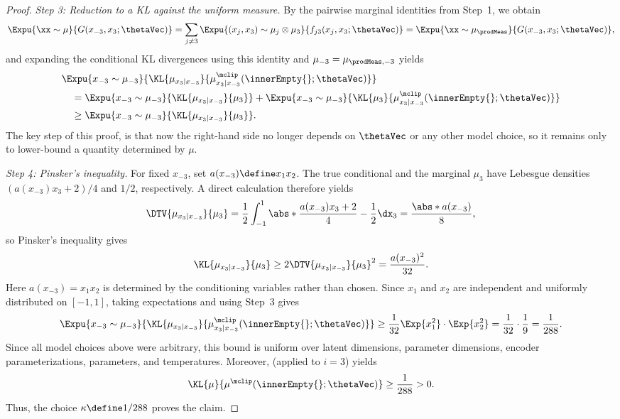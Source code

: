 \documentclass{article}
\begin{document}
\begin{proof}
 \emph{Step 3: Reduction to a KL against the uniform measure.}
 By the pairwise marginal identities from Step~1, we obtain
 \begin{align*}
  \Expu{\xx\sim\mu}{G(x_{-3},x_3;\thetaVec)}
  = \sum_{j\neq3}\Expu{(x_j,x_3)\sim\mu_j\otimes\mu_3}{
   f_{j3}(x_j,x_3;\thetaVec)}
  = \Expu{\xx\sim\mu_\prodMeas}{G(x_{-3},x_3;\thetaVec)},
 \end{align*}
 and expanding the conditional KL divergences using this identity and
 $\mu_{-3}=\mu_{\prodMeas,-3}$ yields
 \begin{align*}
   & \Expu{x_{-3}\sim\mu_{-3}}{
  \KL{\mu_{x_3\vert x_{-3}}}{
  \mu^{\mclip}_{x_3\vert x_{-3}}(\innerEmpty{};\thetaVec)}} \\
   & \quad =
  \Expu{x_{-3}\sim\mu_{-3}}{
   \KL{\mu_{x_3\vert x_{-3}}}{\mu_3}}
  + \Expu{x_{-3}\sim\mu_{-3}}{
  \KL{\mu_3}{
  \mu^{\mclip}_{x_3\vert x_{-3}}(\innerEmpty{};\thetaVec)}} \\
   & \quad \geq
  \Expu{x_{-3}\sim\mu_{-3}}{
   \KL{\mu_{x_3\vert x_{-3}}}{\mu_3}}.
 \end{align*}
 The key step of this proof, is that now the
  right-hand side no longer depends on
  $\thetaVec$ or any other model choice, so it remains only to lower-bound a
  quantity determined by $\mu$.

 \emph{Step 4: Pinsker's inequality.}
 For fixed $x_{-3}$, set $a(x_{-3})\define x_1x_2$. The true conditional and
 the marginal $\mu_3$ have Lebesgue densities $(a(x_{-3})x_3+2)/4$ and $1/2$,
 respectively. A direct calculation therefore yields
 \begin{align*}
  \DTV{\mu_{x_3\vert x_{-3}}}{\mu_3}
   = \frac{1}{2}\int_{-1}^{1}
   \abs*{\frac{a(x_{-3})x_3+2}{4}-\frac12} \dx_3
   = \frac{\abs*{a(x_{-3})}}{8},
 \end{align*}
 so Pinsker's inequality gives
 \begin{align*}
  \KL{\mu_{x_3\vert x_{-3}}}{\mu_3}
  \geq 2\DTV{\mu_{x_3\vert x_{-3}}}{\mu_3}^2
  = \frac{a(x_{-3})^2}{32}.
 \end{align*}
 Here $a(x_{-3})=x_1x_2$ is determined by the conditioning variables rather
 than chosen. Since $x_1$ and $x_2$ are independent and uniformly distributed
 on $[-1,1]$, taking expectations and using Step~3 gives
 \begin{align*}
  \Expu{x_{-3}\sim\mu_{-3}}{
  \KL{\mu_{x_3\vert x_{-3}}}{
  \mu^{\mclip}_{x_3\vert x_{-3}}(\innerEmpty{};\thetaVec)}}
  \geq \frac{1}{32}\Exp{x_1^2}\cdot \Exp{x_2^2}
  = \frac{1}{32}\cdot\frac{1}{9}
  = \frac{1}{288}.
 \end{align*}
 Since all model choices above were arbitrary, this bound is uniform over
 latent dimensions, parameter dimensions, encoder parameterizations,
 parameters, and temperatures. Moreover,
 (applied to $i=3$) yields
 \begin{align*}
  \KL{\mu}{\mu^{\mclip}(\innerEmpty{};\thetaVec)} \geq \frac{1}{288}>0.
 \end{align*}
 Thus, the choice $\kappa\define 1/288$ proves the claim.
\end{proof}
\end{document}
